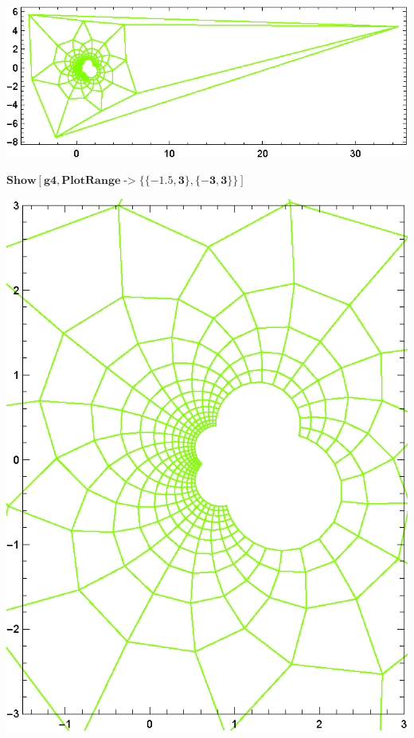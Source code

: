 \documentclass{article}
\begin{document}
\includegraphics{functions_on_complex-plane_gr14.eps}

\begin{doublespace}
\noindent\(\pmb{\text{Show}[\text{g4},\text{PlotRange}\text{-$>$}\{\{-1.5,3\},\{-3,3\}\}]}\)
\end{doublespace}

\includegraphics{functions_on_complex-plane_gr15.eps}
\end{document}
